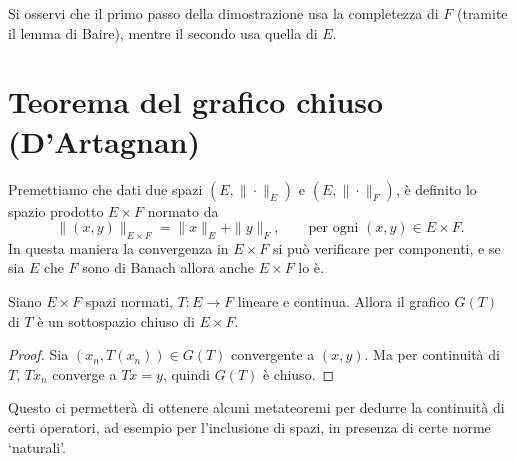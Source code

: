 \begin{remark}
	Si osservi che il primo passo della dimostrazione usa la completezza di $F$ (tramite il lemma di Baire), mentre il secondo usa quella di $E$.
\end{remark}

\section{Teorema del grafico chiuso (D'Artagnan)}
Premettiamo che dati due spazi $(E, \|\cdot\|_E)$ e $(E, \|\cdot\|_F)$, è definito lo spazio prodotto $E \times F$ normato da
\begin{equation*}
	\|(x,y)\|_{E \times F} = \|x\|_E + \|y\|_F, \qquad \text{per ogni $(x,y) \in E \times F$}.
\end{equation*}
In questa maniera la convergenza in $E \times F$ si può verificare per componenti, e se sia $E$ che $F$ sono di Banach allora anche $E \times F$ lo è.

\begin{lemma}
	Siano $E \times F$ spazi normati, $T: E \to F$ lineare e continua.
	Allora il grafico $G(T)$ di $T$ è un sottospazio chiuso di $E \times F$.
\end{lemma}
\begin{proof}
	Sia $(x_n, T(x_n)) \in G(T)$ convergente a $(x,y)$. Ma per continuità di $T$, $Tx_n$ converge a $Tx = y$, quindi $G(T)$ è chiuso.
\end{proof}

Questo ci permetterà di ottenere alcuni metateoremi per dedurre la continuità di certi operatori, ad esempio per l'inclusione di spazi, in presenza di certe norme `naturali'.

